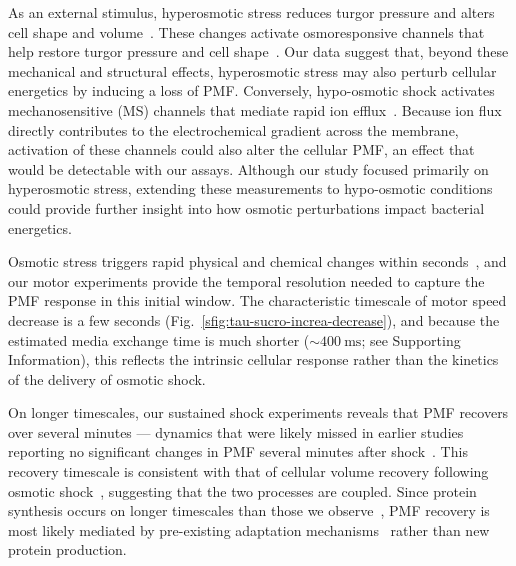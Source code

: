 \documentclass[twocolumn]{biophys-new}%
\begin{document}
As an external stimulus, hyperosmotic stress reduces turgor pressure and alters cell shape and volume~\cite{pilizota_2012,pilizota2013plasmolysis,Rojas2020}. These changes activate osmoresponsive channels that help restore turgor pressure and cell shape~\cite{sleator_hill}. Our data suggest that, beyond these mechanical and structural effects, hyperosmotic stress may also perturb cellular energetics by inducing a loss of PMF. Conversely, hypo-osmotic shock activates mechanosensitive (MS) channels that mediate rapid ion efflux~\cite{wood2010,bremer2019responses}. Because ion flux directly contributes to the electrochemical gradient across the membrane, activation of these channels could also alter the cellular PMF, an effect that would be detectable with our assays. Although our study focused primarily on hyperosmotic stress, extending these measurements to hypo-osmotic conditions could provide further insight into how osmotic perturbations impact bacterial energetics.

Osmotic stress triggers rapid physical and chemical changes within seconds~\cite{pilizota_2012}, and our motor experiments provide the temporal resolution needed to capture the PMF response in this initial window. The characteristic timescale of motor speed decrease is a few seconds (Fig.~\ref{sfig:tau-sucro-increa-decrease}), and because the estimated media exchange time is much shorter ($\sim400~\textrm{ms}$; see Supporting Information), this reflects the intrinsic cellular response rather than the kinetics of the delivery of osmotic shock.

On longer timescales, our sustained shock experiments reveals that PMF recovers over several minutes --- dynamics that were likely missed in earlier studies reporting no significant changes in PMF several minutes after shock~\cite{HOUSSIN1991,shabala_2009}. This recovery timescale is consistent with that of cellular volume recovery following osmotic shock~\cite{pilizota_2012,rosko-2017}, suggesting that the two processes are coupled. Since protein synthesis occurs on longer timescales than those we observe~\cite{poolman2002membrane,weber2006time}, PMF recovery is most likely mediated by pre-existing adaptation mechanisms~\cite{sleator_hill,wood2010,poolman2023} rather than new protein production.
\end{document}
